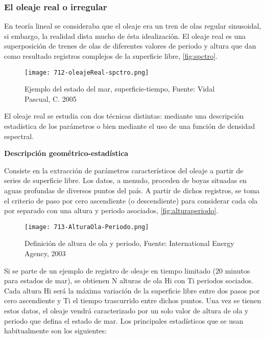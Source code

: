 \subsubsection{El oleaje real o irregular}\label{header-n286}

En teoría lineal se consideraba que el oleaje era un tren de olas
regular sinusoidal, si embargo, la realidad dista mucho de ésta
idealización. El oleaje real es una superposición de trenes de olas de
diferentes valores de periodo y altura que dan como resultado registros
complejos de la superficie libre, \autoref{fig:spctro}.

\begin{figure}
\centering
\texttt{[image: 712-oleajeReal-spctro.png]}
\caption[Ejemplo del estado del mar, superficie-tiempo]{Ejemplo del estado del mar, superficie-tiempo, Fuente: Vidal Pascual, C. 2005}
\label{fig:spctro}
\end{figure}

El oleaje real se estudia con dos técnicas distintas: mediante una
descripción estadística de los parámetros o bien mediante el uso de una
función de densidad espectral.

\textbf{Descripción geométrico-estadística}

Consiste en la extracción de parámetros característicos del oleaje a
partir de series de superficie libre. Los datos, a menudo, proceden de
boyas situadas en aguas profundas de diversos puntos del país. A partir
de dichos registros, se toma el criterio de paso por cero ascendiente (o
descendiente) para considerar cada ola por separado con una altura y
periodo asociados, \autoref{fig:alturaperiodo}.

\begin{figure}
\centering
\texttt{[image: 713-AlturaOla-Periodo.png]}
\caption[Altura de ola y periodo]{Definición de altura de ola y periodo, Fuente: International Energy Agency, 2003}
\label{fig:alturaperiodo}
\end{figure}

Si se parte de un ejemplo de registro de oleaje en tiempo limitado (20
minutos para estados de mar), se obtienen N alturas de ola Hi con Ti
periodos sociados. Cada altura Hi será la máxima variación de la
superficie libre entre dos pasos por cero ascendiente y Ti el tiempo
trascurrido entre dichos puntos. Una vez se tienen estos datos, el
oleaje vendrá caracterizado por un solo valor de altura de ola y periodo
que defina el estado de mar. Los principales estadísticos que se usan
habitualmente son los siguientes:

